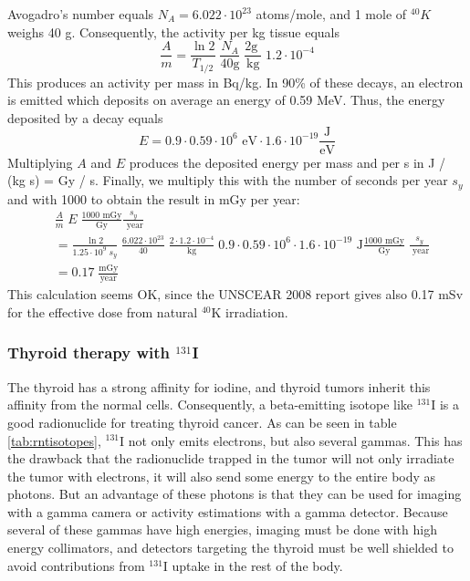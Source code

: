 \documentclass[11pt,oneside]{article}
\begin{document}
Avogadro's number equals $N_A = 6.022 \cdot 10^{23}$ atoms/mole, and 1 mole
of $^{40}K$ weighs 40 g. Consequently, the activity per kg tissue equals
\begin{equation}
  \frac{A}{m} = \frac{\ln 2}{T_{1/2}} \;
  \frac{N_A}{40 \text{g}} \;
  \frac{2 \text{g} \;}{\text{kg}} \;
  1.2 \cdot 10^{-4}
\end{equation}
This produces an activity per mass in Bq/kg.  In 90\% of these decays,
an electron is emitted which deposits on average an energy of 0.59
MeV. Thus, the energy deposited by a decay equals
\begin{equation}
  E = 0.9 \cdot 0.59 \cdot 10^6 \mbox{ eV} \cdot 1.6
    \cdot 10^{-19} \frac{\mbox{J}}{\mbox{eV}}
\end{equation}
Multiplying $A$ and $E$ produces the deposited energy per mass and per
s in J / (kg s) = Gy / s. Finally, we multiply this with the number of
seconds per year $s_y$ and with 1000 to obtain the result in mGy per
year:
\begin{align}
  &\frac{A}{m}\;E \; \frac{\mbox{1000 mGy}}{\mbox{Gy}} \frac{s_y}{\mbox{ year}}\\
  &= \frac{\ln 2}{1.25 \cdot 10^9 \; s_y} \;
  \frac{6.022 \cdot 10^{23}}{40} \;
  \frac{2 \cdot 1.2 \cdot 10^{-4}}{\mbox{kg}} \;
  0.9 \cdot 0.59 \cdot 10^6 \cdot 1.6 \cdot 10^{-19} \mbox{ J}
   \frac{\mbox{1000 mGy}}{\mbox{Gy}} \; \frac{s_y}{\mbox{ year}} \nonumber\\
  &= 0.17 \;\frac{\mbox{mGy}}{\mbox{year}}
\end{align}
This calculation seems OK, since the UNSCEAR 2008 report gives also
0.17 mSv for the effective dose from natural $^{40}$K irradiation.

\subsubsection{Thyroid therapy with $^{131}$I}
The thyroid has a strong affinity for iodine, and thyroid tumors
inherit this affinity from the normal cells. Consequently, a
beta-emitting isotope like $^{131}$I is a good radionuclide for
treating thyroid cancer. As can be seen in table
\ref{tab:rntisotopes}, $^{131}$I not only emits electrons, but also
several gammas. This has the drawback that the radionuclide trapped in
the tumor will not only irradiate the tumor with electrons, it will
also send some energy to the entire body as photons. But an advantage
of these photons is that they can be used for imaging with a gamma
camera or activity estimations with a gamma detector. Because several
of these gammas have high energies, imaging must be done with high
energy collimators, and detectors targeting the thyroid must be well
shielded to avoid contributions from $^{131}$I uptake in the rest of
the body.
\end{document}
